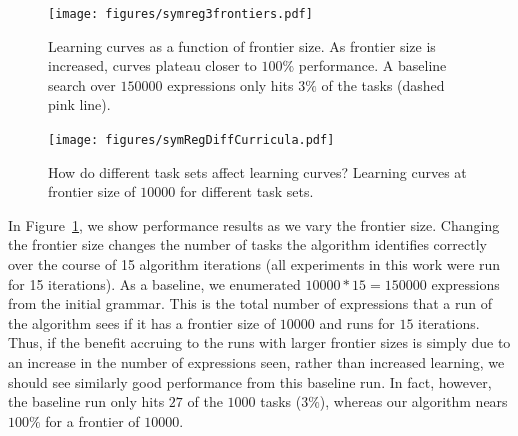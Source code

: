 \documentclass{article}
\begin{document}
\setcounter{subfigure}{0} 
\begin{figure}[ht]
\centering
\texttt{[image: figures/symreg3frontiers.pdf]}
\caption{Learning curves as a function of frontier size.  As frontier
  size is increased, curves plateau closer to $100\%$ performance. A
  baseline search over $150000$ expressions only hits $3\%$ of the
  tasks (dashed pink line). \label{fig:symregLearning}}
\end{figure}
\begin{figure}[ht]
\texttt{[image: figures/symRegDiffCurricula.pdf]}
\caption{How do different task sets affect learning curves? Learning
  curves at frontier size of $10000$ for different task
  sets.} 
\label{fig:symregCurricula}

\end{figure}







In Figure~\ref{fig:symregLearning}, we show performance results as we
vary the frontier size. Changing the frontier size changes the number
of tasks the algorithm identifies correctly over the course of 15
algorithm iterations (all experiments in this work were run for 15
iterations). As a baseline, we enumerated $10000*15=150000$
expressions from the initial grammar. This is the total number of
expressions that a run of the algorithm sees if it has a frontier size
of $10000$ and runs for $15$ iterations. Thus, if the benefit accruing
to the runs with larger frontier sizes is simply due to an increase in
the number of expressions seen, rather than increased learning, we
should see similarly good performance from this baseline run. In fact,
however, the baseline run only hits $27$ of the $1000$ tasks ($3\%$),
whereas our algorithm nears $100\%$ for a frontier of $10000$.
\end{document}
